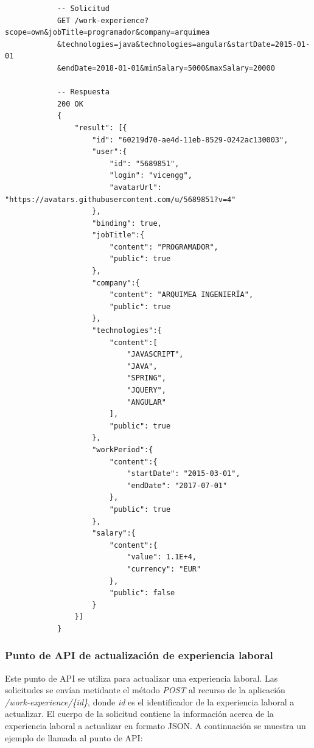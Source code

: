 \documentclass[a4paper, 12pt]{book}
\begin{document}
			{\footnotesize
			\begin{verbatim}
			-- Solicitud
			GET /work-experience?scope=own&jobTitle=programador&company=arquimea
			&technologies=java&technologies=angular&startDate=2015-01-01
			&endDate=2018-01-01&minSalary=5000&maxSalary=20000

			-- Respuesta
			200 OK
			{
			    "result": [{
			        "id": "60219d70-ae4d-11eb-8529-0242ac130003",
			        "user":{
			            "id": "5689851",
			            "login": "vicengg",
			            "avatarUrl": "https://avatars.githubusercontent.com/u/5689851?v=4"
			        },
			        "binding": true,
			        "jobTitle":{
			            "content": "PROGRAMADOR",
			            "public": true
			        },
			        "company":{
			            "content": "ARQUIMEA INGENIERÍA",
			            "public": true
			        },
			        "technologies":{
			            "content":[
			                "JAVASCRIPT",
			                "JAVA",
			                "SPRING",
			                "JQUERY",
			                "ANGULAR"
			            ],
			            "public": true
			        },
			        "workPeriod":{
			            "content":{
			                "startDate": "2015-03-01",
			                "endDate": "2017-07-01"
			            },
			            "public": true
			        },
			        "salary":{
			            "content":{
			                "value": 1.1E+4,
			                "currency": "EUR"
			            },
			            "public": false
			        }
			    }]
			}
			\end{verbatim}
			}

\subsubsection{Punto de API de actualización de experiencia laboral}
\label{subsec:put_work_experience}
Este punto de API se utiliza para actualizar una experiencia laboral.
Las solicitudes se envían metidante el método \emph{POST} al recurso de la aplicación \emph{/work-experience/\{id\}}, donde \emph{id} es el identificador de la experiencia laboral a actualizar.
El cuerpo de la solicitud contiene la información acerca de la experiencia laboral a actualizar en formato JSON.
A continuación se muestra un ejemplo de llamada al punto de API:
\end{document}
